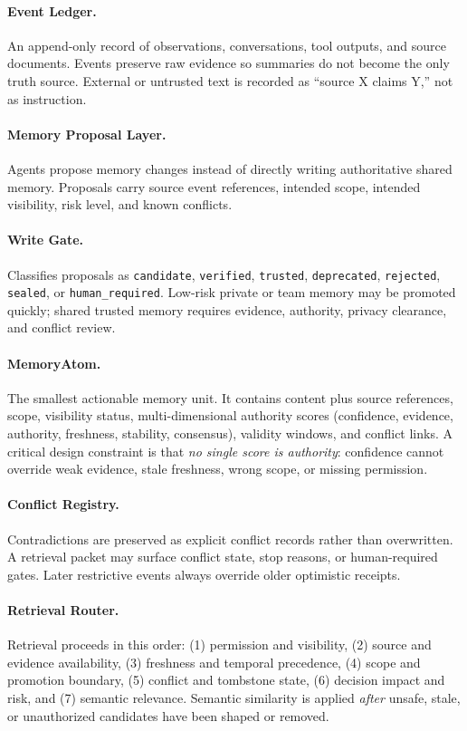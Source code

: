 \documentclass[11pt]{article}
\begin{document}
\paragraph{Event Ledger.}
An append-only record of observations, conversations, tool outputs, and source documents.
Events preserve raw evidence so summaries do not become the only truth source. External
or untrusted text is recorded as ``source X claims Y,'' not as instruction.

\paragraph{Memory Proposal Layer.}
Agents propose memory changes instead of directly writing authoritative shared memory.
Proposals carry source event references, intended scope, intended visibility, risk level,
and known conflicts.

\paragraph{Write Gate.}
Classifies proposals as \texttt{candidate}, \texttt{verified}, \texttt{trusted},
\texttt{deprecated}, \texttt{rejected}, \texttt{sealed}, or \texttt{human\_required}.
Low-risk private or team memory may be promoted quickly; shared trusted memory requires
evidence, authority, privacy clearance, and conflict review.

\paragraph{MemoryAtom.}
The smallest actionable memory unit. It contains content plus source references, scope,
visibility status, multi-dimensional authority scores (confidence, evidence, authority,
freshness, stability, consensus), validity windows, and conflict links.
A critical design constraint is that \emph{no single score is authority}: confidence
cannot override weak evidence, stale freshness, wrong scope, or missing permission.

\paragraph{Conflict Registry.}
Contradictions are preserved as explicit conflict records rather than overwritten.
A retrieval packet may surface conflict state, stop reasons, or human-required gates.
Later restrictive events always override older optimistic receipts.

\paragraph{Retrieval Router.}
Retrieval proceeds in this order: (1) permission and visibility, (2) source and evidence
availability, (3) freshness and temporal precedence, (4) scope and promotion boundary,
(5) conflict and tombstone state, (6) decision impact and risk, and (7) semantic
relevance. Semantic similarity is applied \emph{after} unsafe, stale, or unauthorized
candidates have been shaped or removed.
\end{document}
